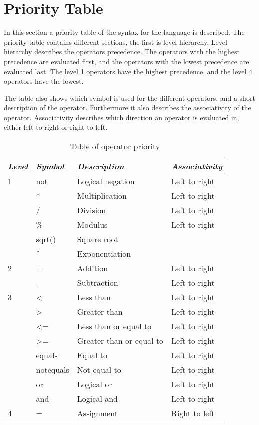\section{Priority Table}
In this section a priority table of the syntax for the language is described. 
The priority table contains different sections, the first is level hierarchy. Level hierarchy describes the operators precedence. The operators with the highest precedence are evaluated first, and the operators with the lowest precedence are evaluated last. The level 1 operators have the highest precedence, and the level 4 operators have the lowest.
 
The table also shows which symbol is used for the different operators, and a short description of the operator. Furthermore it also describes the associativity of the operator. Associativity describes which direction an operator is evaluated in, either left to right or right to left.

\begin{table}[H]
	\center
	\begin{tabular}{|l|l|l|l|}
	\hline
	\emph{Level} & \emph{Symbol} & \emph{Description} & \emph{Associativity} \\ 
 		\hline
 		1 & not & Logical negation & Left to right \\
 		& * & Multiplication & Left to right\\
 		& / & Division & Left to right\\
 		& \% & Modulus & Left to right\\
 		& sqrt() & Square root & \\
 		& $\texttt{\^{}}$ & Exponentiation &\\
 		\hline
 		2 & + & Addition & Left to right \\
 		& - & Subtraction & Left to right\\
 		\hline
 		3 & <  & Less than & Left to right \\
 		& > & Greater than & Left to right \\
 		& <= & Less than or equal to & Left to right \\
 		& >= & Greater than or equal to & Left to right \\
 		& equals & Equal to & Left to right \\
 		& notequals & Not equal to & Left to right \\
 		& or & Logical or & Left to right \\
 		& and & Logical and & Left to right\\
 		\hline
 		4 & = & Assignment & Right to left \\
 		\hline
	\end{tabular}
	\label{tab:priority}
	\caption{Table of operator priority}
\end{table} 

